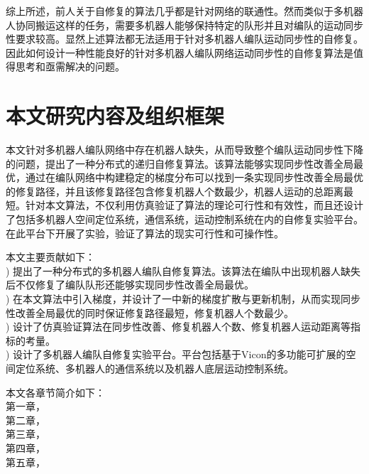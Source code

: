 综上所述，前人关于自修复的算法几乎都是针对网络的联通性。然而类似于多机器人协同搬运这样的任务，需要多机器人能够保持特定的队形并且对编队的运动同步性要求较高。显然上述算法都无法适用于针对多机器人编队运动同步性的自修复。因此如何设计一种性能良好的针对多机器人编队网络运动同步性的自修复算法是值得思考和亟需解决的问题。

\section{本文研究内容及组织框架}
本文针对多机器人编队网络中存在机器人缺失，从而导致整个编队运动同步性下降的问题，提出了一种分布式的递归自修复算法。该算法能够实现同步性改善全局最优，通过在编队网络中构建稳定的梯度分布可以找到一条实现同步性改善全局最优的修复路径，并且该修复路径包含修复机器人个数最少，机器人运动的总距离最短。针对本文算法，不仅利用仿真验证了算法的理论可行性和有效性，而且还设计了包括多机器人空间定位系统，通信系统，运动控制系统在内的自修复实验平台。在此平台下开展了实验，验证了算法的现实可行性和可操作性。

本文主要贡献如下：\\
) 提出了一种分布式的多机器人编队自修复算法。该算法在编队中出现机器人缺失后不仅修复了编队队形还能够实现同步性改善全局最优。\\
) 在本文算法中引入梯度，并设计了一中新的梯度扩散与更新机制，从而实现同步性改善全局最优的同时保证修复路径最短，修复机器人个数最少。\\
) 设计了仿真验证算法在同步性改善、修复机器人个数、修复机器人运动距离等指标的考量。\\
) 设计了多机器人编队自修复实验平台。平台包括基于Vicon的多功能可扩展的空间定位系统、多机器人的通信系统以及机器人底层运动控制系统。

本文各章节简介如下：\\
\indent 第一章，\\
\indent 第二章，\\
\indent 第三章，\\
\indent 第四章，\\
\indent 第五章，\\

